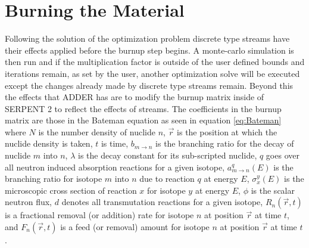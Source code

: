 \documentclass[]{elsarticle}
\begin{document}
\section{Burning the Material} \label{sec:burn}
Following the solution of the optimization problem discrete type streams have
their effects applied before the burnup step begins. A monte-carlo simulation is
then run and if the multiplication factor is outside of the user defined bounds
and iterations remain, as set by the user, another optimization solve will be
executed except the changes already made by discrete type streams remain. 
Beyond this the effects that ADDER has are to modify the burnup matrix inside of
SERPENT 2 to reflect the effects of streams. The coefficients in the burnup
matrix are those in the Bateman equation as seen in equation \ref{eq:Bateman}
where $N$ is the number density of nuclide $n$, $\vec{r}$ is the position at
which the nuclide density is taken, $t$ is time, $b_{m \to n}$ is the branching ratio for the decay of nuclide $m$ into $n$, $\lambda$ is the decay constant
for its sub-scripted nuclide,
$q$ goes over all neutron induced absorption reactions for a given isotope, 
$a_{m \to n}^{q}(E)$ is the branching ratio for isotope $m$ into $n$ due to
reaction $q$ at energy $E$,  $\sigma_{x}^{y}(E)$ is the microscopic
cross section of reaction $x$ for isotope $y$ at energy $E$, $\phi$ is the
scalar neutron flux, $d$ denotes all
transmutation reactions for a given isotope, $R_{n}(\vec{r},t)$ is a
fractional removal (or addition) rate for isotope $n$ at position $\vec{r}$ at
time $t$, and $F_{n}(\vec{r},t)$ is a feed (or removal) amount for isotope
$n$ at position $\vec{r}$ at time $t$. 
\end{document}
